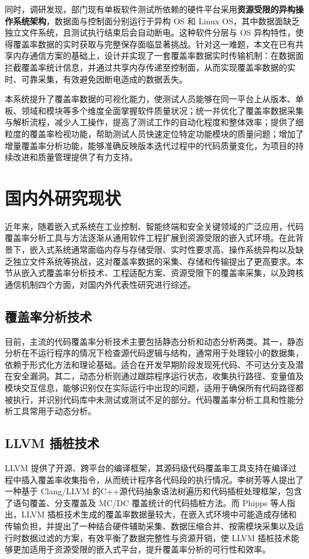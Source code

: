     同时，调研发现，部门现有单板软件测试所依赖的硬件平台采用\textbf{资源受限的异构操作系统架构}，数据面与控制面分别运行于异构 OS 和 Linux OS，其中数据面缺乏独立文件系统，且测试执行结束后会自动断电。这种软件分层与 OS 异构特性，使得覆盖率数据的实时获取与完整保存面临显著挑战。针对这一难题，本文在已有共享内存通信方案的基础上，设计并实现了一套覆盖率数据实时传输机制：在数据面拦截覆盖率统计信息，并通过共享内存传递至控制面，从而实现覆盖率数据的实时、可靠采集，有效避免因断电造成的数据丢失。

    本系统提升了覆盖率数据的可视化能力，使测试人员能够在同一平台上从版本、单板、领域和模块等多个维度全面掌握软件质量状况；统一并优化了覆盖率数据采集与解析流程，减少人工操作，提高了测试工作的自动化程度和整体效率；提供了细粒度的覆盖率检视功能，帮助测试人员快速定位特定功能模块的质量问题；增加了增量覆盖率分析功能，能够准确反映版本迭代过程中的代码质量变化，为项目的持续改进和质量管理提供了有力支持。

\section{国内外研究现状}
    近年来，随着嵌入式系统在工业控制、智能终端和安全关键领域的广泛应用，代码覆盖率分析工具与方法逐渐从通用软件工程扩展到资源受限的嵌入式环境。在此背景下，嵌入式系统通常面临内存与存储受限、实时性要求高、操作系统异构以及缺乏独立文件系统等挑战，这对覆盖率数据的采集、存储和传输提出了更高要求。本节从嵌入式覆盖率分析技术、工程适配方案、资源受限下的覆盖率采集，以及跨核通信机制四个方面，对国内外代表性研究进行综述。

\subsection{覆盖率分析技术}
    目前，主流的代码覆盖率分析技术主要包括静态分析和动态分析两类\cite{张大方2023面向国产嵌入式系统的代码覆盖率实时分析工具}。其一，静态分析在不运行程序的情况下检查源代码逻辑与结构，通常用于处理较小的数据集，依赖于形式化方法和理论基础。适合在开发早期阶段发现死代码、不可达分支及潜在安全漏洞。其二，动态分析则通过跟踪程序运行状态，收集执行路径、变量值及模块交互信息，能够识别仅在实际运行中出现的问题，适用于确保所有代码路径都被执行，并识别代码库中未测试或测试不足的部分。代码覆盖率分析工具和性能分析工具常用于动态分析。

\subsection{LLVM 插桩技术}
    LLVM\cite{llvmoverview} 提供了开源、跨平台的编译框架，其源码级代码覆盖率工具支持在编译过程中插入覆盖率收集指令，从而统计程序各代码段的执行情况。李树芳等人\cite{李树芳2017采用Clang/LLVM的C++源代码覆盖率分析插装方法}提出了一种基于 Clang/LLVM 的C++源代码抽象语法树遍历和代码插桩处理框架，包含了语句覆盖、分支覆盖及 MC/DC 覆盖统计的代码插桩方法。而 Phipps 等人\cite{Phipps2020source}指出，LLVM 插桩技术生成的覆盖率数据量较大，在嵌入式环境中可能造成存储和传输负担，并提出了一种结合硬件辅助采集、数据压缩合并、按需模块采集以及运行时数据过滤的方案，有效平衡了数据完整性与资源开销，使 LLVM 插桩技术能够更加适用于资源受限的嵌入式平台，提升覆盖率分析的可行性和效率。

